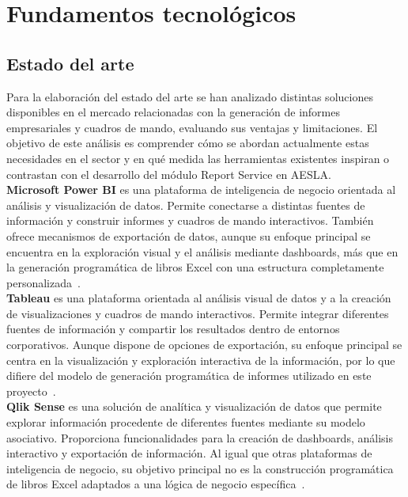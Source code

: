 \documentclass[11pt,a4paper,titlepage,oneside]{report}
\begin{document}

\chapter{Fundamentos tecnológicos}

\section{Estado del arte}

Para la elaboración del estado del arte se han analizado distintas soluciones disponibles en el mercado relacionadas con la generación de informes empresariales y cuadros de mando, evaluando sus ventajas y limitaciones. El objetivo de este análisis es comprender cómo se abordan actualmente estas necesidades en el sector y en qué medida las herramientas existentes inspiran o contrastan con el desarrollo del módulo Report Service en AESLA.\\

\textbf{Microsoft Power BI} es una plataforma de inteligencia de negocio
orientada al análisis y visualización de datos. Permite conectarse a distintas
fuentes de información y construir informes y cuadros de mando interactivos.
También ofrece mecanismos de exportación de datos, aunque su enfoque principal
se encuentra en la exploración visual y el análisis mediante dashboards, más
que en la generación programática de libros Excel con una estructura
completamente personalizada~\cite{PowerBIDocs}. \\

\textbf{Tableau} es una plataforma orientada al análisis visual de datos y a la
creación de visualizaciones y cuadros de mando interactivos. Permite integrar
diferentes fuentes de información y compartir los resultados dentro de
entornos corporativos. Aunque dispone de opciones de exportación, su enfoque
principal se centra en la visualización y exploración interactiva de la
información, por lo que difiere del modelo de generación programática de
informes utilizado en este proyecto~\cite{TableauDocs}. \\

\textbf{Qlik Sense} es una solución de analítica y visualización de datos que
permite explorar información procedente de diferentes fuentes mediante su
modelo asociativo. Proporciona funcionalidades para la creación de dashboards,
análisis interactivo y exportación de información. Al igual que otras
plataformas de inteligencia de negocio, su objetivo principal no es la
construcción programática de libros Excel adaptados a una lógica de negocio
específica~\cite{QlikDocs}. \\
\end{document}
